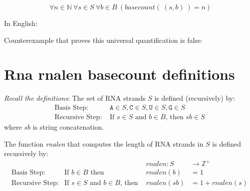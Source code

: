 \documentclass[12pt, oneside]{article}
\newcommand{\A}[0]{\texttt{A}}
\newcommand{\C}[0]{\texttt{C}}
\newcommand{\G}[0]{\texttt{G}}
\newcommand{\U}[0]{\texttt{U}}
\begin{document}
\vspace{30pt}



\vfill

\[
    ~\forall n \in \mathbb{N} ~\forall s \in S ~\forall b \in B  ~(basecount(~(s,b)~) = n)
\]

In English: \phantom{There exists an ordered $3$-tuple 
at which the predicate $BC$ evaluates to $T$.}

\vspace{30pt}

Counterexample that proves this universal quantification is false:
\phantom{$(\G\G, \G, 3)$ or $(\G\A\U\G, \G, 2)$)}

\vspace{30pt}



\vfill \vfill
\section*{Rna rnalen basecount definitions}


{\it Recall the definitions}: The set of RNA strands $S$ is defined (recursively) by:
\[
\begin{array}{ll}
\textrm{Basis Step: } & \A \in S, \C \in S, \U \in S, \G \in S \\
\textrm{Recursive Step: } & \textrm{If } s \in S\textrm{ and }b \in B \textrm{, then }sb \in S
\end{array}
\]
where $sb$ is string concatenation.

The function \textit{rnalen} that computes the length of RNA strands in $S$ is defined recursively by:
\[
\begin{array}{llll}
& & \textit{rnalen} : S & \to \mathbb{Z}^+ \\
\textrm{Basis Step:} & \textrm{If } b \in B\textrm{ then } & \textit{rnalen}(b) & = 1 \\
\textrm{Recursive Step:} & \textrm{If } s \in S\textrm{ and }b \in B\textrm{, then  } & \textit{rnalen}(sb) & = 1 + \textit{rnalen}(s)
\end{array}
\]
\end{document}
